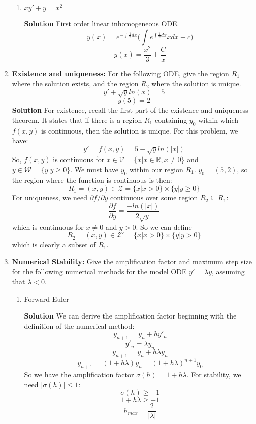 \documentclass[letterpaper, fontsize=11pt]{scrartcl} %
\numberwithin{equation}{section} %
\numberwithin{figure}{section} %
\numberwithin{table}{section} %
\begin{document}
\begin{enumerate}
\begin{enumerate}
\item $xy' + y = x^2$ \par
\textbf{Solution} \newline
First order linear inhomogeneous ODE.
$$y(x) = e^{-\int \frac{1}{x} dx}\bigg(\int e^{\int \frac{1}{x} dx} x dx + c \bigg)$$
$$y(x) = \frac{x^2}{3} + \frac{C}{x}$$
\end{enumerate}
\item \textbf{Existence and uniqueness:} For the following ODE, give the region $R_1$ where the solution exists, and the region $R_2$ where the solution is unique. 
$$ y' + \sqrt{y} ln(x) = 5$$
$$y(5) = 2$$
\textbf{Solution} \newline
For existence, recall the first part of the existence and uniqueness theorem. It states that if there is a region $R_1$ containing $y_0$ within which $f(x,y)$ is continuous, then the solution is unique. For this problem, we have:
$$ y' = f(x,y) = 5 - \sqrt{y}ln(|x|)$$
So, $f(x,y)$ is continuous for $x \in \mathcal{V} = \{x | x \in \mathbb{R}, x \neq 0\}$ and $y \in \mathcal{W} = \{ y | y \geq 0 \}$. We must have $y_0$ within our region $R_1$. $y_0 = (5,2)$, so the region where the function is continuous is then:
$$ R_1 = (x,y) \in \mathcal{Z} = \{x | x > 0 \} \times \{ y | y \geq 0 \}$$
For uniqueness, we need $ \partial f / \partial y $ continuous over some region $R_2 \subseteq R_1$:
$$\frac{\partial f}{\partial y} = \frac{-ln(|x|)}{2\sqrt{y}}$$
which is continuous for $x \neq 0$ and $y > 0$. So we can define 
$$ R_2 = (x,y) \in \mathcal{Z'} = \{x | x > 0 \} \times \{ y | y > 0 \}$$
which is clearly a subset of $R_1$.


\item \textbf{Numerical Stability:} Give the amplification factor and maximum step size for the following numerical methods for the model ODE $y' = \lambda y$, assuming that $\lambda < 0$.
\begin{enumerate}
\item Forward Euler \par
\textbf{Solution} \newline
We can derive the amplification factor beginning with the definition of the numerical method:
$$y_{n+1} = y_n + hy'_n$$
$$y'_n = \lambda y_n$$
$$y_{n+1} = y_n + h\lambda y_n$$
$$y_{n+1} = (1 + h\lambda)y_n = (1 + h \lambda)^{n+1} y_0$$
So we have the amplification factor $\sigma(h) = 1 + h \lambda$. For stability, we need $|\sigma(h)|\leq 1$:
$$\sigma(h) \geq -1$$
$$1 + h\lambda \geq -1 $$
$$h_{max} = \frac{2}{|\lambda|}$$


\end{enumerate}
\end{enumerate}
\end{document}
